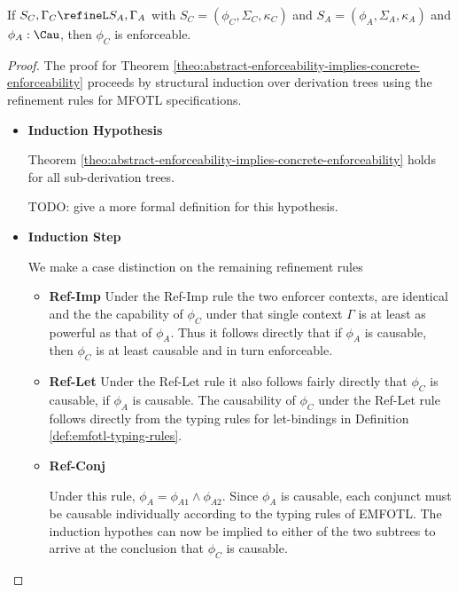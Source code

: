 \begin{theorem}
    \label{theo:abstract-enforceability-implies-concrete-enforceability}
    If $S_C, \Gamma_C \refineL S_A, \Gamma_A$ with $S_C = (\phi_C, \Sigma_C, \kappa_C)$ and
    $S_A = (\phi_A, \Sigma_A, \kappa_A)$ and $\phi_A : \Cau$, then
    $\phi_C$ is enforceable.
\end{theorem}
\begin{proof}
    \label{proof:abstract-enforceability-implies-concrete-enforceability}
    The proof for Theorem
    \ref{theo:abstract-enforceability-implies-concrete-enforceability}
    proceeds by structural induction over derivation trees using
    the refinement rules for MFOTL specifications.
    \begin{itemize}
        \item \textbf{Induction Hypothesis}
        
        Theorem
        \ref{theo:abstract-enforceability-implies-concrete-enforceability}
        holds for all sub-derivation trees.
        
        TODO: give a more formal definition for this hypothesis.
        
        \item \textbf{Induction Step}

        We make a case distinction on the remaining refinement rules

        \begin{itemize}
            \item \textbf{Ref-Imp}
            Under the Ref-Imp rule the two enforcer contexts, are identical and the
            the capability of $\phi_C$ under that single context $\Gamma$ is at least as
            powerful as that of $\phi_A$.
            Thus it follows directly that if $\phi_A$ is causable, then $\phi_C$ is at least
            causable and in turn enforceable.

            \item \textbf{Ref-Let}
            Under the Ref-Let rule it also follows fairly directly that 
            $\phi_C$ is causable, if $\phi_A$ is causable.
            The causability of $\phi_C$ under the Ref-Let rule
            follows directly from the typing rules for let-bindings
            in Definition \ref{def:emfotl-typing-rules}.

            \item \textbf{Ref-Conj}

            Under this rule, $\phi_A = \phi_{A1} \wedge \phi_{A2}$.
            Since $\phi_A$ is causable, each conjunct must be causable individually
            according to the typing rules of EMFOTL.
            The induction hypothes can now be implied to either of the
            two subtrees to arrive at the conclusion that $\phi_C$
            is causable.


\end{itemize}
\end{itemize}
\end{proof}

